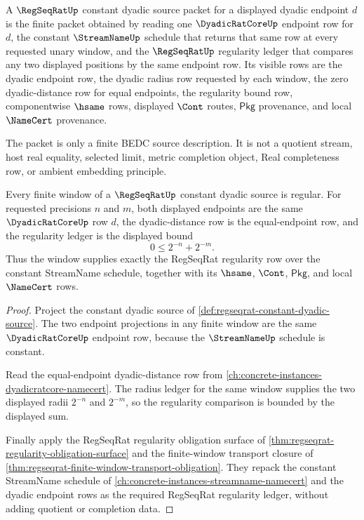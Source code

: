 \begin{definition}
\label{def:regseqrat-constant-dyadic-source}
A $\RegSeqRatUp$ constant dyadic source packet for a displayed dyadic endpoint
$d$ is the finite packet obtained by reading one $\DyadicRatCoreUp$ endpoint
row for $d$, the constant $\StreamNameUp$ schedule that returns that same row
at every requested unary window, and the $\RegSeqRatUp$ regularity ledger that
compares any two displayed positions by the same endpoint row. Its visible
rows are the dyadic endpoint row, the dyadic radius row requested by each
window, the zero dyadic-distance row for equal endpoints, the regularity bound
row, componentwise $\hsame$ rows, displayed $\Cont$ routes, $\mathsf{Pkg}$
provenance, and local $\NameCert$ provenance.

The packet is only a finite BEDC source description. It is not a quotient
stream, host real equality, selected limit, metric completion object, Real
completeness row, or ambient embedding principle.
\end{definition}

\begin{theorem}
\label{thm:regseqrat-constant-dyadic-regularity}
Every finite window of a $\RegSeqRatUp$ constant dyadic source is regular. For
requested precisions $n$ and $m$, both displayed endpoints are the same
$\DyadicRatCoreUp$ row $d$, the dyadic-distance row is the equal-endpoint row,
and the regularity ledger is the displayed bound
$$
0 \leq 2^{-n}+2^{-m}.
$$
Thus the window supplies exactly the RegSeqRat regularity row over the constant
StreamName schedule, together with its $\hsame$, $\Cont$, $\mathsf{Pkg}$, and
local $\NameCert$ rows.
\end{theorem}
\begin{proof}
Project the constant dyadic source of
\autoref{def:regseqrat-constant-dyadic-source}. The two endpoint projections
in any finite window are the same $\DyadicRatCoreUp$ endpoint row, because the
$\StreamNameUp$ schedule is constant.

Read the equal-endpoint dyadic-distance row from
\autoref{ch:concrete-instances-dyadicratcore-namecert}. The radius ledger for
the same window supplies the two displayed radii $2^{-n}$ and $2^{-m}$, so the
regularity comparison is bounded by the displayed sum.

Finally apply the RegSeqRat regularity obligation surface of
\autoref{thm:regseqrat-regularity-obligation-surface} and the finite-window
transport closure of
\autoref{thm:regseqrat-finite-window-transport-obligation}. They repack the
constant StreamName schedule of
\autoref{ch:concrete-instances-streamname-namecert} and the dyadic endpoint
rows as the required RegSeqRat regularity ledger, without adding quotient or
completion data.
\end{proof}

